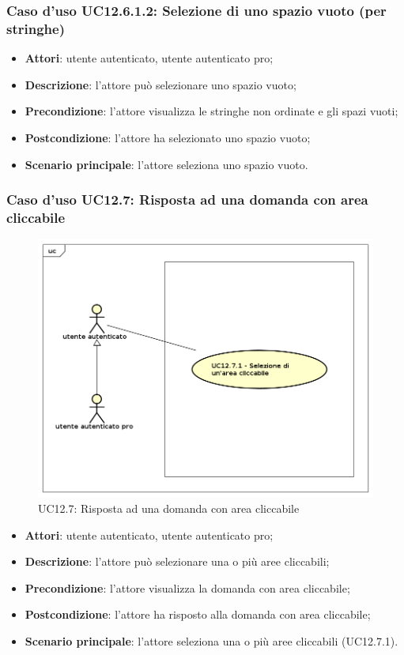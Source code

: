 \subsubsection{Caso d'uso UC12.6.1.2: Selezione di uno spazio vuoto (per stringhe)}
\begin{itemize}
\item \textbf{Attori}: utente autenticato, utente autenticato pro;
\item \textbf{Descrizione}: l'attore può selezionare uno spazio vuoto;
\item \textbf{Precondizione}: l'attore visualizza le stringhe non ordinate e gli spazi vuoti;
\item \textbf{Postcondizione}: l'attore ha selezionato uno spazio vuoto;
\item \textbf{Scenario principale}: l'attore seleziona uno spazio vuoto.
\end{itemize}

\subsubsection{Caso d'uso UC12.7: Risposta ad una domanda con area cliccabile}
\label{UC12.7}
\begin{figure}[h]
	\centering
	\includegraphics[scale=0.5]{UML/UC12_7.png}
	\caption{UC12.7: Risposta ad una domanda con area cliccabile}
\end{figure}
\begin{itemize}
\item \textbf{Attori}: utente autenticato, utente autenticato pro;
\item \textbf{Descrizione}: l'attore può selezionare una o più aree cliccabili;
\item \textbf{Precondizione}: l'attore visualizza la domanda con area cliccabile;
\item \textbf{Postcondizione}: l'attore ha risposto alla domanda con area cliccabile;
\item \textbf{Scenario principale}: l'attore seleziona una o più aree cliccabili (UC12.7.1).
\end{itemize}

